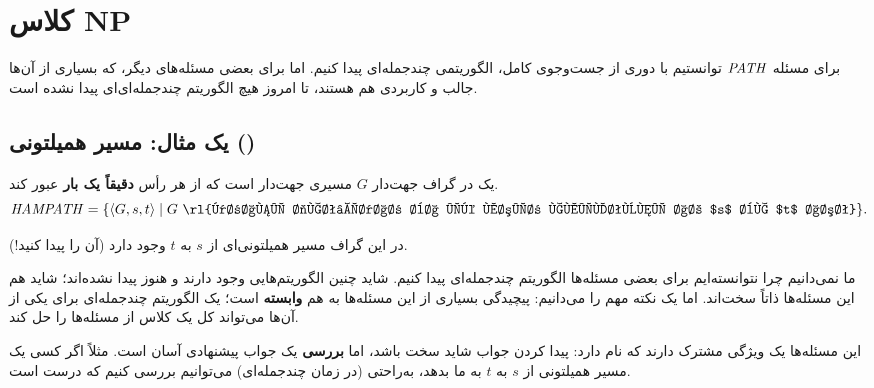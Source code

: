 \chapter{کلاس NP}

برای مسئله $\mathit{PATH}$ توانستیم با دوری از جست‌وجوی کامل، الگوریتمی چندجمله‌ای پیدا کنیم. اما برای بعضی مسئله‌های دیگر، که بسیاری از آن‌ها جالب و کاربردی هم هستند، تا امروز هیچ الگوریتم چندجمله‌ای‌ای پیدا نشده است.

\section{یک مثال: مسیر همیلتونی ()}

\begin{definition}[\lr{HAMPATH}]
یک  در گراف جهت‌دار $G$ مسیری جهت‌دار است که از هر رأس \textbf{دقیقاً یک بار} عبور کند.
\[\prob{HAMPATH}=\{\enc{G,s,t}\st G\ \text{\rl{گرافی جهت‌دار با یک مسیر همیلتونی از $s$ به $t$ است}}\}.\]
\end{definition}
\begin{ltrfig}
\end{ltrfig}
در این گراف مسیر همیلتونی‌ای از $s$ به $t$ وجود دارد (آن را پیدا کنید!).

ما نمی‌دانیم چرا نتوانسته‌ایم برای بعضی مسئله‌ها الگوریتم چندجمله‌ای پیدا کنیم. شاید چنین الگوریتم‌هایی وجود دارند و هنوز پیدا نشده‌اند؛ شاید هم این مسئله‌ها ذاتاً سخت‌اند. اما یک نکته مهم را می‌دانیم: پیچیدگی بسیاری از این مسئله‌ها به هم \textbf{وابسته} است؛ یک الگوریتم چندجمله‌ای برای یکی از آن‌ها می‌تواند کل یک کلاس از مسئله‌ها را حل کند.

این مسئله‌ها یک ویژگی مشترک دارند که  نام دارد: پیدا کردن جواب شاید سخت باشد، اما \textbf{بررسی} یک جواب پیشنهادی آسان است. مثلاً اگر کسی یک مسیر همیلتونی از $s$ به $t$ به ما بدهد، به‌راحتی (در زمان چندجمله‌ای) می‌توانیم بررسی کنیم که درست است.

